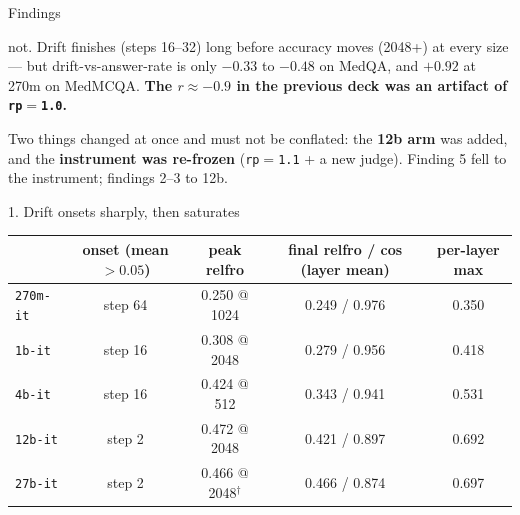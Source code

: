 \documentclass[aspectratio=169,10pt]{beamer}
\newcommand{\bad}[1]{\textcolor{down}{#1}}
\begin{document}
\begin{frame}{Findings}
\begin{enumerate}
{      not.} Drift finishes (steps 16--32) long before accuracy moves (2048+) at
      every size --- but drift-vs-answer-rate is only $-0.33$ to $-0.48$ on
      MedQA, and \bad{$+0.92$} at 270m on MedMCQA. \textbf{The $r \approx -0.9$
      in the previous deck was an artifact of \texttt{rp}$=$\texttt{1.0}.}
  \end{enumerate}
  \vfill
  {\footnotesize Two things changed at once and must not be conflated: the
  \textbf{12b arm} was added, and the \textbf{instrument was re-frozen}
  (\texttt{rp}$=$\texttt{1.1} + a new judge). Finding 5 fell to the instrument;
  findings 2--3 to 12b.}
\end{frame}

\begin{frame}{1. Drift onsets sharply, then saturates}
  \centering
  \begin{tabular}{lcccc}
    \toprule
    & onset (mean $>0.05$) & peak relfro & final relfro / cos (layer mean) & per-layer max \\
    \midrule
    \texttt{270m-it} & step 64 & 0.250 @ 1024 & 0.249 / 0.976 & 0.350 \\
    \texttt{1b-it}   & step 16 & 0.308 @ 2048 & 0.279 / 0.956 & 0.418 \\
    \texttt{4b-it}   & step 16 & 0.424 @ 512  & 0.343 / 0.941 & 0.531 \\
    \texttt{12b-it}  & \bad{step 2} & 0.472 @ 2048 & 0.421 / 0.897 & 0.692 \\
    \texttt{27b-it}  & \bad{step 2} & 0.466 @ 2048$^\dagger$ & 0.466 / 0.874 & 0.697 \\
    \bottomrule
  \end{tabular}


\end{frame}
\end{document}
